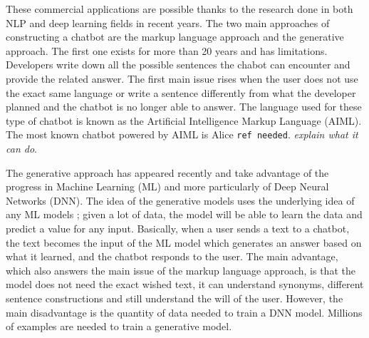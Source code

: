 These commercial applications are possible thanks to the research done in both NLP and deep learning fields in recent years. The two main approaches of constructing a chatbot are the markup language approach and the generative approach. The first one exists for more than 20 years and has limitations. Developers write down all the possible sentences the chabot can encounter and provide the related answer. The first main issue rises when the user does not use the exact same language or write a sentence differently from what the developer planned and the chatbot is no longer able to answer. The language used for these type of chatbot is known as the Artificial Intelligence Markup Language (AIML). The most known chatbot powered by AIML is Alice \texttt{ref needed}. \textit{explain what it can do}.

The generative approach has appeared recently and take advantage of the progress in Machine Learning (ML) and more particularly of Deep Neural Networks (DNN). The idea of the generative models uses the underlying idea of any ML models ; given a lot of data, the model will be able to learn the data and predict a value for any input. Basically, when a user sends a text to a chatbot, the text becomes the input of the ML model which generates an answer based on what it learned, and the chatbot responds to the user. The main advantage, which also answers the main issue of the markup language approach, is that the model does not need the exact wished text, it can understand synonyms, different sentence constructions and still understand the will of the user. However, the main disadvantage is the quantity of data needed to train a DNN model. Millions of examples are needed to train a generative model.
